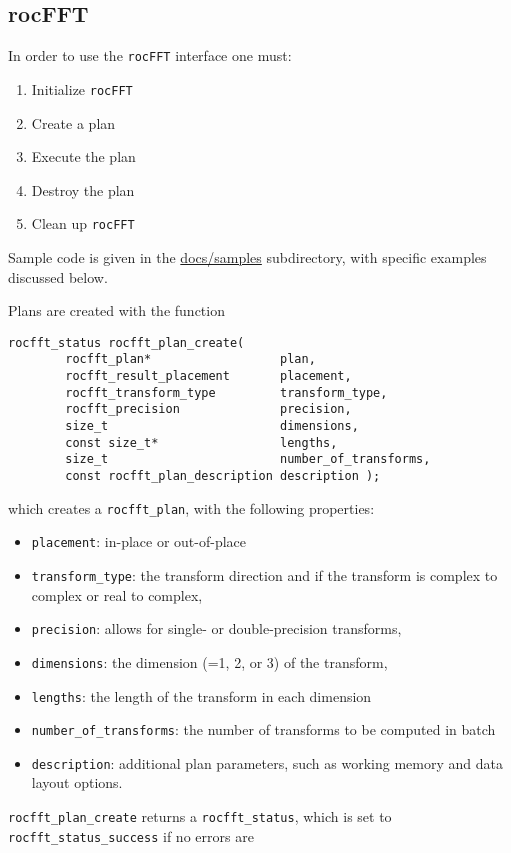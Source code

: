 \documentclass[10pt]{article}
\renewcommand{\(}{\left(}
\renewcommand{\)}{\right)}
\begin{document}
\subsection{rocFFT}

In order to use the \texttt{rocFFT} interface one must:
\begin{enumerate}
\item Initialize \texttt{rocFFT} 
\item Create a plan
\item Execute the plan
\item Destroy the plan
\item Clean up \texttt{rocFFT}
\end{enumerate}
Sample code is given in the \url{docs/samples} subdirectory, with
specific examples discussed below.

Plans are created with the function
\begin{lstlisting}
rocfft_status rocfft_plan_create(
        rocfft_plan*                  plan,
        rocfft_result_placement       placement,
        rocfft_transform_type         transform_type,
        rocfft_precision              precision,
        size_t                        dimensions,
        const size_t*                 lengths,
        size_t                        number_of_transforms,
        const rocfft_plan_description description );
\end{lstlisting}
which creates a \lstinline{rocfft_plan}, with the following properties:
\begin{itemize}
\item \lstinline{placement}: in-place or out-of-place
\item \lstinline{transform_type}: the transform
  direction and if the transform is complex to complex or real to complex,
\item \lstinline{precision}: allows for single- or
  double-precision transforms,
\item \lstinline{dimensions}: the dimension (=1, 2, or 3) of the
  transform,
\item \lstinline{lengths}: the length of the transform in each dimension
\item \lstinline{number_of_transforms}: the number of transforms to be
  computed in batch
\item \lstinline{description}: additional plan parameters, such as
  working memory and data layout options.
\end{itemize}
\lstinline{rocfft_plan_create} returns a \lstinline{rocfft_status},
which is set to \lstinline{rocfft_status_success} if no errors are
\end{document}
